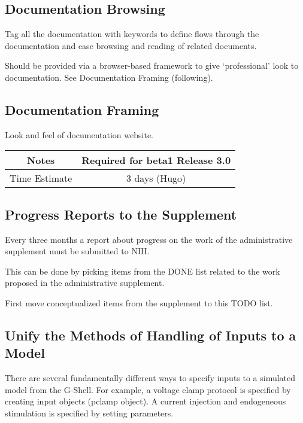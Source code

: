 \documentclass[12pt]{article}
\begin{document}
\subsection{Documentation Browsing}

Tag all the documentation with keywords to define flows through the
documentation and ease browsing and reading of related documents.

Should be provided via a browser-based framework to give `professional' look to documentation. See Documentation Framing (following).


\subsection{Documentation Framing}

Look and feel of documentation website.

{
  \vspace{5mm}
  \centering
  \begin{tabular}{|c|c|}
    \hline
    Notes
    & Required for beta1 Release 3.0 \\
    \hline
    Time Estimate
    & 3 days (Hugo) \\
    \hline
  \end{tabular}
}


\subsection{Progress Reports to the Supplement}

Every three months a report about progress on the work of the
administrative supplement must be submitted to NIH.

This can be done by picking items from the DONE list related to the
work proposed in the administrative supplement.

First move conceptualized items from the supplement to this TODO list.


\subsection{Unify the Methods of Handling of Inputs to a Model}

There are several fundamentally different ways to specify inputs to a
simulated model from the G-Shell.  For example, a voltage clamp
protocol is specified by creating input objects (pclamp object).  A
current injection and endogeneous stimulation is specified by setting
parameters.
\end{document}
